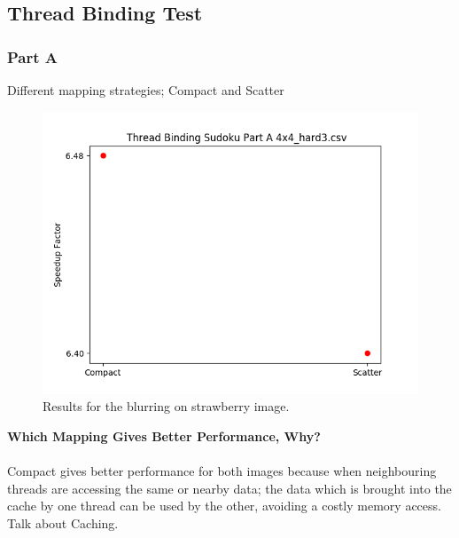 \documentclass{article}
\newcommand\tab[1][0.5cm]{\hspace*{#1}}
\begin{document}
\subsection{Thread Binding Test}
\subsubsection{Part A}
\begin{description}
    \item[Different mapping strategies; Compact and Scatter]
\end{description}
\begin{figure}[!htb]
    \centering
    \includegraphics[width=1\linewidth]{./img/binding_part_2_A.png}
    \caption{Results for the blurring on strawberry image.}
\end{figure}
\textbf{Which Mapping Gives Better Performance, Why?}\\
\\ \tab Compact gives better performance for both images because 
when neighbouring threads are accessing the same or nearby data;
the data which is brought into the cache by one thread can be used 
by the other, avoiding a costly memory access.
\\ Talk about Caching.


\newpage
\end{document}
